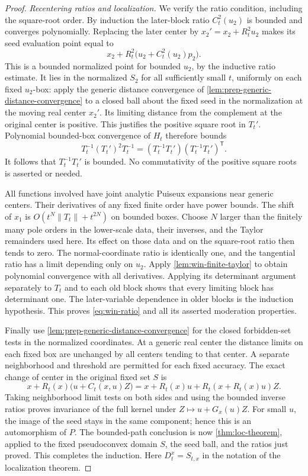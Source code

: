 \begin{proof}
\emph{Recentering ratios and localization.} We verify the ratio condition, including the square-root order. By induction the later-block ratio $C_t^2(u_2)$ is bounded and converges polynomially.  Replacing the later center by $x_2'=x_2+R_t^2u_2$ makes its seed evaluation point equal to
\[
         x_2+R_t^2\bigl(u_2+C_t^2(u_2)p_2\bigr).
\]
This is a bounded normalized point for bounded $u_2$, by the inductive ratio estimate. It lies in the normalized $S_2$ for all sufficiently small $t$, uniformly on each fixed $u_2$-box: apply the generic distance convergence of \cref{lem:prep-generic-distance-convergence} to a closed ball about the fixed seed in the normalization at the moving real center $x_2'$. Its limiting distance from the complement at the original center is positive. This justifies the positive square root in $T_t'$. Polynomial bounded-box convergence of $H_t$ therefore bounds
\[
        T_t^{-1}(T_t')^2T_t^{-1}
          =(T_t^{-1}T_t')(T_t^{-1}T_t')^{\mathsf T}.
\]
It follows that $T_t^{-1}T_t'$ is bounded.  No commutativity of the positive square roots is asserted or needed.

All functions involved have joint analytic Puiseux expansions near generic centers.  Their derivatives of any fixed finite order have power bounds.  The shift of $x_1$ is $O(t^N\|T_t\|+t^{2N})$ on bounded boxes.  Choose $N$ larger than the finitely many pole orders in the lower-scale data, their inverses, and the Taylor remainders used here.  Its effect on those data and on the square-root ratio then tends to zero.  The normal-coordinate ratio is identically one, and the tangential ratio has a limit depending only on $u_2$.  Apply \cref{lem:win-finite-taylor} to obtain polynomial convergence with all derivatives.  Applying its determinant argument separately to $T_t$ and to each old block shows that every limiting block has determinant one.  The later-variable dependence in older blocks is the induction hypothesis.  This proves \eqref{eq:win-ratio} and all its asserted moderation properties.

Finally use \cref{lem:prep-generic-distance-convergence} for the closed forbidden-set tests in the normalized coordinates.  At a generic real center the distance limits on each fixed box are unchanged by all centers tending to that center.  A separate neighborhood and threshold are permitted for each fixed accuracy. The exact change of center in the original fixed set $S$ is
\[
 x+R_t(x)\bigl(u+C_t(x,u)Z\bigr)
       =x+R_t(x)u+R_t(x+R_t(x)u)Z.
\]
Taking neighborhood limit tests on both sides and using the bounded inverse ratios proves invariance of the full kernel under $Z\mapsto u+G_x(u)Z$.  For small $u$, the image of the seed stays in the same component; hence this is an automorphism of $P$.  The bounded-path conclusion is now \cref{thm:loc-theorem}, applied to the fixed pseudoconvex domain $S$, the seed ball, and the ratios just proved.  This completes the induction. Here $D_t^x=S_{t,x}$ in the notation of the localization theorem.
\end{proof}

